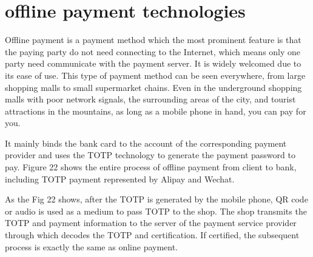 \documentclass[journal]{IEEEtran}
\begin{document}
\section{offline payment technologies}
Offline payment is a payment method which the most prominent feature is that the paying party do not need connecting to the Internet, which means only one party need communicate with the payment server. It is widely welcomed due to its ease of use. This type of payment method can be seen everywhere, from large shopping malls to small supermarket chains. Even in the underground shopping malls with poor network signals, the surrounding areas of the city, and tourist attractions in the mountains, as long as a mobile phone in hand, you can pay for you. 

It mainly binds the bank card to the account of the corresponding payment provider and uses the TOTP technology to generate the payment password to pay. Figure 22 shows the entire process of offline payment from client to bank, including TOTP payment represented by Alipay and Wechat.

As the Fig 22 shows, after the TOTP is generated by the mobile phone, QR code or audio is used as a medium to pass TOTP to the shop. The shop transmits the TOTP and payment information to the server of the payment service provider through which decodes the TOTP and certification. If certified, the subsequent process is exactly the same as online payment.
\end{document}
